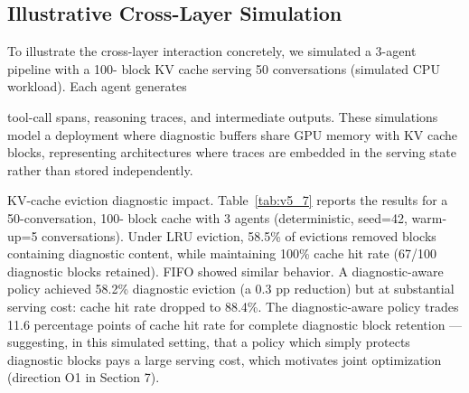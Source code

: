 \documentclass[preprint,12pt]{elsarticle}
\begin{document}
\subsection{Illustrative Cross-Layer Simulation}
To illustrate the cross-layer interaction concretely, we simulated a 3-agent pipeline with a 100- block KV cache serving 50 conversations (simulated CPU workload). Each agent generates


tool-call spans, reasoning traces, and intermediate outputs. These simulations model a deployment where diagnostic buffers share GPU memory with KV cache blocks, representing architectures where traces are embedded in the serving state rather than stored independently.


KV-cache eviction diagnostic impact. Table~\ref{tab:v5_7} reports the results for a 50-conversation, 100- block cache with 3 agents (deterministic, seed=42, warm-up=5 conversations). Under LRU eviction, 58.5\% of evictions removed blocks containing diagnostic content, while maintaining 100\% cache hit rate (67/100 diagnostic blocks retained). FIFO showed similar behavior. A diagnostic-aware policy achieved 58.2\% diagnostic eviction (a 0.3 pp reduction) but at substantial serving cost: cache hit rate dropped to 88.4\%. The diagnostic-aware policy trades 11.6 percentage points of cache hit rate for complete diagnostic block retention --- suggesting, in this simulated setting, that a policy which simply protects diagnostic blocks pays a large serving cost, which motivates joint optimization (direction O1 in Section 7).
\end{document}

